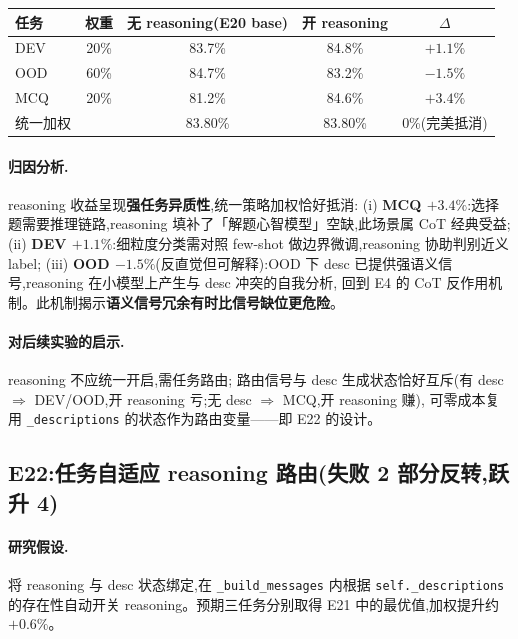 \documentclass[11pt,a4paper]{ctexart}
\begin{document}
\begin{table}[h]
\centering
\small
\begin{tabular}{lcccc}
\toprule
任务 & 权重 & 无 reasoning(E20 base) & 开 reasoning & $\Delta$ \\
\midrule
DEV & 20\% & 83.7\% & 84.8\% & $+1.1\%$ \\
OOD & 60\% & 84.7\% & 83.2\% & $\mathbf{-1.5\%}$ \\
MCQ & 20\% & 81.2\% & 84.6\% & $\mathbf{+3.4\%}$ \\
\midrule
统一加权 & & 83.80\% & 83.80\% & 0\%(完美抵消) \\
\bottomrule
\end{tabular}
\end{table}

\paragraph{归因分析.}reasoning 收益呈现\textbf{强任务异质性},统一策略加权恰好抵消:
(i) \textbf{MCQ $+3.4\%$}:选择题需要推理链路,reasoning 填补了「解题心智模型」空缺,此场景属 CoT 经典受益;
(ii) \textbf{DEV $+1.1\%$}:细粒度分类需对照 few-shot 做边界微调,reasoning 协助判别近义 label;
(iii) \textbf{OOD $-1.5\%$}(反直觉但可解释):OOD 下 desc 已提供强语义信号,reasoning 在小模型上产生与 desc 冲突的自我分析,
回到 E4 的 CoT 反作用机制。此机制揭示\textbf{语义信号冗余有时比信号缺位更危险}。

\paragraph{对后续实验的启示.}reasoning 不应统一开启,需任务路由;
路由信号与 desc 生成状态恰好互斥(有 desc $\Rightarrow$ DEV/OOD,开 reasoning 亏;无 desc $\Rightarrow$ MCQ,开 reasoning 赚),
可零成本复用 \texttt{\_descriptions} 的状态作为路由变量——即 E22 的设计。

\subsection{E22:任务自适应 reasoning 路由(失败 2 部分反转,跃升 4)}

\paragraph{研究假设.}将 reasoning 与 desc 状态绑定,在 \texttt{\_build\_messages} 内根据
\texttt{self.\_descriptions} 的存在性自动开关 reasoning。预期三任务分别取得 E21 中的最优值,加权提升约 $+0.6\%$。
\end{document}
